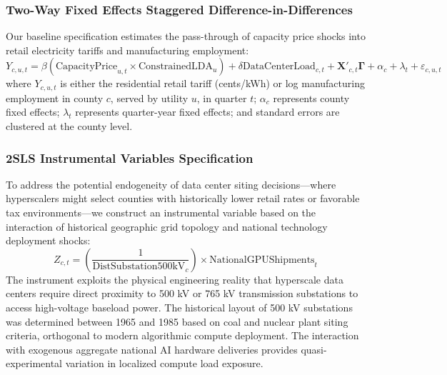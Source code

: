 \documentclass[11pt,a4paper]{article}
\begin{document}
\subsubsection{Two-Way Fixed Effects Staggered Difference-in-Differences}
Our baseline specification estimates the pass-through of capacity price shocks into retail electricity tariffs and manufacturing employment:
\begin{equation}\label{eq:did}
    Y_{c,u,t} = \beta \left( \text{CapacityPrice}_{u,t} \times \text{ConstrainedLDA}_u \right) + \delta \text{DataCenterLoad}_{c,t} + \mathbf{X}'_{c,t}\mathbf{\Gamma} + \alpha_c + \lambda_t + \varepsilon_{c,u,t}
\end{equation}
where $Y_{c,u,t}$ is either the residential retail tariff (cents/kWh) or log manufacturing employment in county $c$, served by utility $u$, in quarter $t$; $\alpha_c$ represents county fixed effects; $\lambda_t$ represents quarter-year fixed effects; and standard errors are clustered at the county level.

\subsubsection{2SLS Instrumental Variables Specification}
To address the potential endogeneity of data center siting decisions---where hyperscalers might select counties with historically lower retail rates or favorable tax environments---we construct an instrumental variable based on the interaction of historical geographic grid topology and national technology deployment shocks:
\begin{equation}
    Z_{c,t} = \left( \frac{1}{\text{DistSubstation500kV}_c} \right) \times \text{NationalGPUShipments}_t
\end{equation}
The instrument exploits the physical engineering reality that hyperscale data centers require direct proximity to 500 kV or 765 kV transmission substations to access high-voltage baseload power. The historical layout of 500 kV substations was determined between 1965 and 1985 based on coal and nuclear plant siting criteria, orthogonal to modern algorithmic compute deployment. The interaction with exogenous aggregate national AI hardware deliveries provides quasi-experimental variation in localized compute load exposure.
\end{document}
